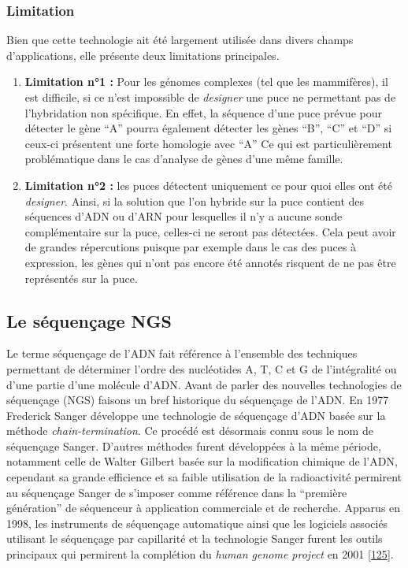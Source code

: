 \documentclass[12pt,a4paper,twoside]{ugathesis}
\theoremstyle{definition}
\theoremstyle{definition}
\theoremstyle{definition}
\theoremstyle{remark}
\begin{document}
\subsubsection{Limitation}\label{limitation}

Bien que cette technologie ait été largement utilisée dans divers champs
d'applications, elle présente deux limitations principales.

\begin{enumerate}
\def\labelenumi{\arabic{enumi}.}
\item
  \textbf{Limitation n°1 :} Pour les génomes complexes (tel que les
  mammifères), il est difficile, si ce n'est impossible de
  \emph{designer} une puce ne permettant pas de l'hybridation non
  spécifique. En effet, la séquence d'une puce prévue pour détecter le
  gène ``A'' pourra également détecter les gènes ``B'', ``C'' et ``D''
  si ceux-ci présentent une forte homologie avec ``A'' Ce qui est
  particulièrement problématique dans le cas d'analyse de gènes d'une
  même famille.
\item
  \textbf{Limitation n°2 :} les puces détectent uniquement ce pour quoi
  elles ont été \emph{designer}. Ainsi, si la solution que l'on hybride
  sur la puce contient des séquences d'ADN ou d'ARN pour lesquelles il
  n'y a aucune sonde complémentaire sur la puce, celles-ci ne seront pas
  détectées. Cela peut avoir de grandes répercutions puisque par exemple
  dans le cas des puces à expression, les gènes qui n'ont pas encore été
  annotés risquent de ne pas être représentés sur la puce.
\end{enumerate}

\newpage

\hypertarget{ngs}{\subsection{Le séquençage NGS}\label{ngs}}

Le terme séquençage de l'ADN fait référence à l'ensemble des techniques
permettant de déterminer l'ordre des nucléotides A, T, C et G de
l'intégralité ou d'une partie d'une molécule d'ADN. Avant de parler des
nouvelles technologies de séquençage (NGS) faisons un bref historique du
séquençage de l'ADN. En 1977 Frederick Sanger développe une technologie
de séquençage d'ADN basée sur la méthode \emph{chain-termination}. Ce
procédé est désormais connu sous le nom de séquençage Sanger. D'autres
méthodes furent développées à la même période, notamment celle de Walter
Gilbert basée sur la modification chimique de l'ADN, cependant sa grande
efficience et sa faible utilisation de la radioactivité permirent au
séquençage Sanger de s'imposer comme référence dans la ``première
génération'' de séquenceur à application commerciale et de recherche.
Apparus en 1998, les instruments de séquençage automatique ainsi que les
logiciels associés utilisant le séquençage par capillarité et la
technologie Sanger furent les outils principaux qui permirent la
complétion du \emph{human genome project} en 2001
{[}\protect\hyperlink{ref-Collins2003}{125}{]}.
\end{document}
